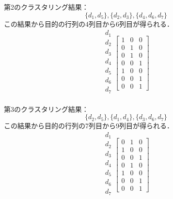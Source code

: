 \documentclass[japanese]{jnlp_1.3e}
\begin{document}
第2のクラスタリング結果：
\[
\{ d_1,d_5 \}, \{ d_2,d_3 \}, \{ d_4,d_6,d_7 \}
\]
この結果から目的の行列の4列目から6列目が得られる．
\[
                        \begin{array}{c}
                                 d_1\\
                                 d_2\\
                                 d_3\\
                                 d_4\\
                                 d_5\\
                                 d_6\\
                                 d_7\\
                        \end{array}
\left[
                        \begin{array}{rrr}
                                 1& 0& 0\\
                                 0& 1& 0\\
                                 0& 1& 0\\
                                 0& 0& 1\\
                                 1& 0& 0\\
                                 0& 0& 1\\
                                 0& 0& 1
                        \end{array}
\right]
\]


第3のクラスタリング結果：
\[
\{ d_2,d_5 \}, \{ d_1, d_4 \}, \{ d_3, d_6,d_7 \}
\]
この結果から目的の行列の7列目から9列目が得られる．
\[
                        \begin{array}{c}
                                 d_1\\
                                 d_2\\
                                 d_3\\
                                 d_4\\
                                 d_5\\
                                 d_6\\
                                 d_7\\
                        \end{array}
\left[
                        \begin{array}{rrr}
                                 0& 1& 0\\
                                 1& 0& 0\\
                                 0& 0& 1\\
                                 0& 1& 0\\
                                 1& 0& 0\\
                                 0& 0& 1\\
                                 0& 0& 1
                        \end{array}
\right]
\]
\end{document}
